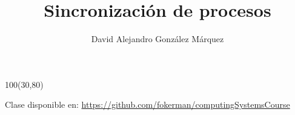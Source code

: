 \documentclass[aspectratio=169]{beamer}
\title{\Huge Sincronización de procesos}
\author{David Alejandro González Márquez}
\date{}
\begin{document}
\begin{frame}[plain]
    \titlepage
    \begin{textblock}{100}(30,80)
    \begin{tcolorbox}[size=small,width=\textwidth,colback={gray!30},title={}]
    \begin{center}
     \scriptsize Clase disponible en: \url{https://github.com/fokerman/computingSystemsCourse}
    \end{center}
    \end{tcolorbox}
    \end{textblock}
\end{frame}
\end{document}
